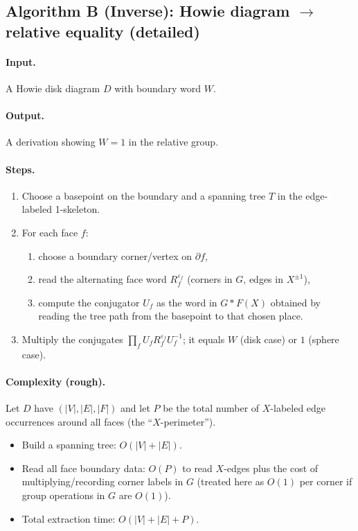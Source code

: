 \documentclass[11pt]{article}
\theoremstyle{definition}
\theoremstyle{plain}
\theoremstyle{remark}
\begin{document}
\subsection*{Algorithm B (Inverse): Howie diagram $\to$ relative equality (detailed)}
\paragraph{Input.} A Howie disk diagram $D$ with boundary word $W$.
\paragraph{Output.} A derivation showing $W=1$ in the relative group.

\paragraph{Steps.}
\begin{enumerate}[leftmargin=2.2em]
\item Choose a basepoint on the boundary and a spanning tree $T$ in the edge-labeled 1-skeleton.
\item For each face $f$:
\begin{enumerate}[leftmargin=2em]
\item choose a boundary corner/vertex on $\partial f$,
\item read the alternating face word $R_f^{\varepsilon_f}$ (corners in $G$, edges in $X^{\pm1}$),
\item compute the conjugator $U_f$ as the word in $G*F(X)$ obtained by reading the tree path from the basepoint to that chosen place.
\end{enumerate}
\item Multiply the conjugates $\prod_f U_f R_f^{\varepsilon_f}U_f^{-1}$; it equals $W$ (disk case) or $1$ (sphere case).
\end{enumerate}



\paragraph{Complexity (rough).}\cite{howie1981,howie1984}
Let $D$ have $(|V|,|E|,|F|)$ and let $P$ be the total number of $X$-labeled edge occurrences around all faces (the ``$X$-perimeter'').
\begin{itemize}[leftmargin=2em]
\item Build a spanning tree: $O(|V|+|E|)$.
\item Read all face boundary data: $O(P)$ to read $X$-edges plus the cost of multiplying/recording corner labels in $G$ (treated here as $O(1)$ per corner if group operations in $G$ are $O(1)$).
\item Total extraction time: $O(|V|+|E|+P)$.
\end{itemize}
\end{document}
